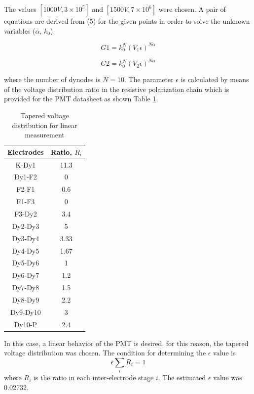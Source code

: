 \documentclass[letterpaper, 10 pt, conference]{ieeeconf}  %
\begin{document}
The values $[1000 V, 3 \times 10^5 ]$ and $[1500 V, 7 \times 10^6]$ were chosen. A pair of equations are derived from (5) for the given points in order to solve the unknown variables ($\alpha$, $k_0$).

\begin{equation}
G1 = k_0^N (V_1 \epsilon)^{N \alpha}
\end{equation}

\begin{equation}
G2 = k_0^N (V_2 \epsilon)^{N \alpha}
\end{equation}

where the number of dynodes is $N=10$. The parameter $\epsilon$ is calculated by means of the voltage distribution ratio in the resistive polarization chain which is provided for the PMT datasheet as shown Table \ref{net}.

\begin{table}[ht]
\centering
  \caption{ Tapered voltage distribution for linear measurement}
  \begin{tabular}{ | c | c |}
    \hline
    Electrodes & Ratio, $R_i$  \\ \hline
    K-Dy1 & 11.3  \\ \hline
    Dy1-F2 & 0  \\ \hline
    F2-F1 &  0.6 \\ \hline
    F1-F3 & 0 \\ \hline
    F3-Dy2 & 3.4 \\ \hline
    Dy2-Dy3 & 5 \\ \hline
    Dy3-Dy4 & 3.33 \\ \hline
    Dy4-Dy5 & 1.67  \\ \hline
    Dy5-Dy6 & 1  \\ \hline
    Dy6-Dy7 & 1.2  \\ \hline
    Dy7-Dy8 & 1.5  \\ \hline
    Dy8-Dy9 & 2.2  \\ \hline
    Dy9-Dy10 & 3  \\ \hline
    Dy10-P & 2.4  \\
    \hline
  \end{tabular}
  \label{net}
\end{table}

In this case, a linear behavior of the PMT is desired, for this reason, the tapered voltage distribution was chosen. The condition for determining the $\epsilon$ value is
\begin{equation}
\epsilon  \sum_i R_i = 1
\end{equation}
where $R_i$ is the ratio in each inter-electrode stage $i$. The estimated $\epsilon$ value was 0.02732.
\end{document}
